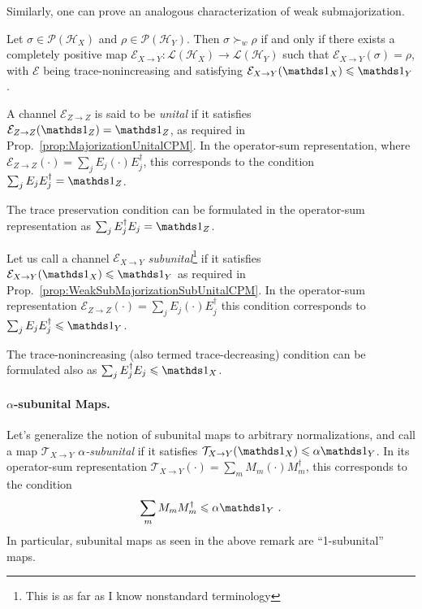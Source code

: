 \documentclass[11pt,a4paper]{article}
\def\Hs{\mathscr{H}}%
\newcommand{\LOps}{\mathscr{L}}
\newcommand{\POps}{\mathscr{P}}
\begin{document}
Similarly, one can prove an analogous characterization of weak submajorization.
\begin{prop}
  \label{prop:WeakSubMajorizationSubUnitalCPM}
  Let $\sigma\in\POps(\Hs_X)$ and $\rho\in\POps(\Hs_Y)$. Then $\sigma\succ_w\rho$ if and only if
  there exists a completely positive map $\mathcal{E}_{X\rightarrow Y} : \LOps(\Hs_X)\rightarrow\LOps(\Hs_Y)$
  such that $\mathcal{E}_{X\rightarrow Y}(\sigma) = \rho$, with $\mathcal{E}$ being trace-nonincreasing and
  satisfying $\mathcal{E}_{X\rightarrow Y}(\Ident_X)\leqslant \Ident_Y$.
\end{prop}

\begin{remark}
  \label{rem:AboutUnitalCPMs}
  A channel $\mathcal{E}_{Z\rightarrow Z}$ is said to be {\em unital} if it satisfies
  $\mathcal{E}_{Z\rightarrow Z}(\Ident_Z) = \Ident_Z$, as required in Prop.~\ref{prop:MajorizationUnitalCPM}. In
  the operator-sum representation, where
  $\mathcal{E}_{Z\rightarrow Z}(\cdot) = \sum_j E_j\left(\cdot\right)E_j^\dagger$, this corresponds to the condition
  $\sum_j E_j E_j^\dagger = \Ident_Z$.

  The trace preservation condition can be formulated in the operator-sum representation as
  $\sum_j E_j^\dagger E_j = \Ident_Z$.

  Let us call a channel $\mathcal{E}_{X\rightarrow Y}$ {\em subunital}\footnote{This is as far as I know
    nonstandard terminology} if it satisfies $\mathcal{E}_{X\rightarrow Y}(\Ident_X) \leqslant \Ident_Y$ as
  required in Prop.~\ref{prop:WeakSubMajorizationSubUnitalCPM}. In the operator-sum representation
  $\mathcal{E}_{Z\rightarrow Z}(\cdot) = \sum_j E_j\left(\cdot\right)E_j^\dagger$ this condition corresponds
  to $\sum_j E_j E_j^\dagger \leqslant \Ident_Y$.

  The trace-nonincreasing (also termed trace-decreasing) condition can be formulated also as
  $\sum_j E_j^\dagger E_j \leqslant \Ident_X$.
\end{remark}

\paragraph{$\alpha$-subunital Maps.} Let's generalize the notion of subunital maps to arbitrary normalizations,
and call a map $\mathcal{T}_{X\rightarrow Y}$ {\em $\alpha$-subunital} if it satisfies
$\mathcal{T}_{X\rightarrow Y}(\Ident_X) \leqslant \alpha \Ident_Y$. In its operator-sum representation
$\mathcal{T}_{X\rightarrow Y}(\cdot) = \sum_m M_m \left(\cdot\right) M_m^\dagger$, this corresponds to the
condition
\begin{align}
  \label{eq:lambdaSubUnital}
  \sum_m M_m M_m^\dagger \leqslant \alpha \Ident_Y\ .
\end{align}
In particular, subunital maps as seen in the above remark are ``1-subunital'' maps.
\end{document}
